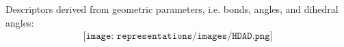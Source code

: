Descriptors derived from geometric parameters, i.e. bonds, angles, and dihedral angles:
\begin{align*}
\texttt{[image: representations/images/HDAD.png]}
\end{align*}
